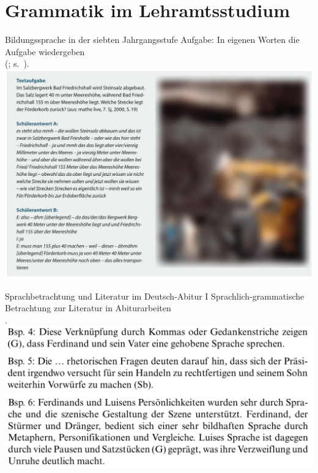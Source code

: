 \section{Grammatik im Lehramtsstudium}

\begin{frame}
  {Bildungssprache in der siebten Jahrgangsstufe}
  \pause
  Aufgabe: In eigenen Worten die Aufgabe wiedergeben\\
  (\citealt{GogolinLange2011}; s.\ \citealt{Feilke2012}).\\[0.5\baselineskip]
  \pause
  \centering
  \includegraphics[height=0.68\textheight]{graphics/feilke_blur}
\end{frame}

\begin{frame}
  {Sprachbetrachtung und Literatur im Deutsch-Abitur I}
  \pause
  Sprachlich-grammatische Betrachtung zur Literatur in Abiturarbeiten\\
  \citep{Haecker2009}.\\[\baselineskip]
  \pause
  \centering
  \includegraphics[height=0.5\textheight]{graphics/haecker1}
\end{frame}

